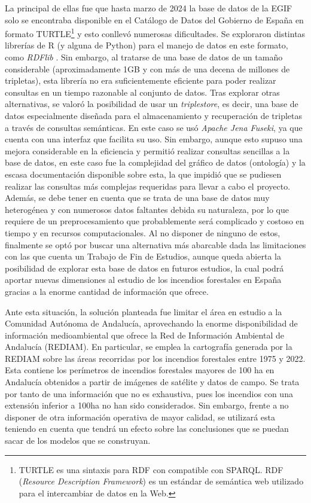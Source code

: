 \documentclass[12pt,a4paper,]{book}
\let\rmarkdownfootnote\footnote%
\def\footnote{\protect\rmarkdownfootnote}
\numberwithin{dummy}{section}
\theoremstyle{ocrenumbox}
\theoremstyle{blacknumex}
\theoremstyle{blacknumbox}
\theoremstyle{ocrenum}
\theoremstyle{ocrenum}
\begin{document}
La principal de ellas fue que hasta marzo de 2024 la base de datos de la
EGIF solo se encontraba disponible en el Catálogo de Datos del Gobierno
de España en formato TURTLE\footnote{TURTLE es una sintaxis para RDF con
  compatible con SPARQL. RDF (\emph{Resource Description Framework}) es
  un estándar de semántica web utilizado para el intercambiar de datos
  en la Web.} y esto conllevó numerosas dificultades. Se exploraron
distintas librerías de R (y alguna de Python) para el manejo de datos en
este formato, como \emph{RDFlib} \citep{rdflib}. Sin embargo, al
tratarse de una base de datos de un tamaño considerable (aproximadamente
1GB y con más de una decena de millones de tripletas), esta librería no
era suficientemente eficiente para poder realizar consultas en un tiempo
razonable al conjunto de datos. Tras explorar otras alternativas, se
valoró la posibilidad de usar un \emph{triplestore}, es decir, una base
de datos especialmente diseñada para el almacenamiento y recuperación de
tripletas a través de consultas semánticas. En este caso se usó
\emph{Apache Jena Fuseki}, ya que cuenta con una interfaz que facilita
su uso. Sin embargo, aunque esto supuso una mejora considerable en la
eficiencia y permitió realizar consultas sencillas a la base de datos,
en este caso fue la complejidad del gráfico de datos (ontología) y la
escasa documentación disponible sobre esta, la que impidió que se
pudiesen realizar las consultas más complejas requeridas para llevar a
cabo el proyecto. Además, se debe tener en cuenta que se trata de una
base de datos muy heterogénea y con numerosos datos faltantes debida su
naturaleza, por lo que requiere de un preprocesamiento que probablemente
será complicado y costoso en tiempo y en recursos computacionales. Al no
disponer de ninguno de estos, finalmente se optó por buscar una
alternativa más abarcable dada las limitaciones con las que cuenta un
Trabajo de Fin de Estudios, aunque queda abierta la posibilidad de
explorar esta base de datos en futuros estudios, la cual podrá aportar
nuevas dimensiones al estudio de los incendios forestales en España
gracias a la enorme cantidad de información que ofrece.

Ante esta situación, la solución planteada fue limitar el área en
estudio a la Comunidad Autónoma de Andalucía, aprovechando la enorme
disponibilidad de información medioambiental que ofrece la Red de
Información Ambiental de Andalucía (REDIAM). En particular, se emplea la
cartografía generada por la REDIAM sobre las áreas recorridas por los
incendios forestales entre 1975 y 2022. Esta contiene los perímetros de
incendios forestales mayores de 100 ha en Andalucía obtenidos a partir
de imágenes de satélite y datos de campo. Se trata por tanto de una
información que no es exhaustiva, pues los incendios con una extensión
inferior a 100ha no han sido considerados. Sin embargo, frente a no
disponer de otra información operativa de mayor calidad, se utilizará
esta teniendo en cuenta que tendrá un efecto sobre las conclusiones que
se puedan sacar de los modelos que se construyan.
\end{document}
